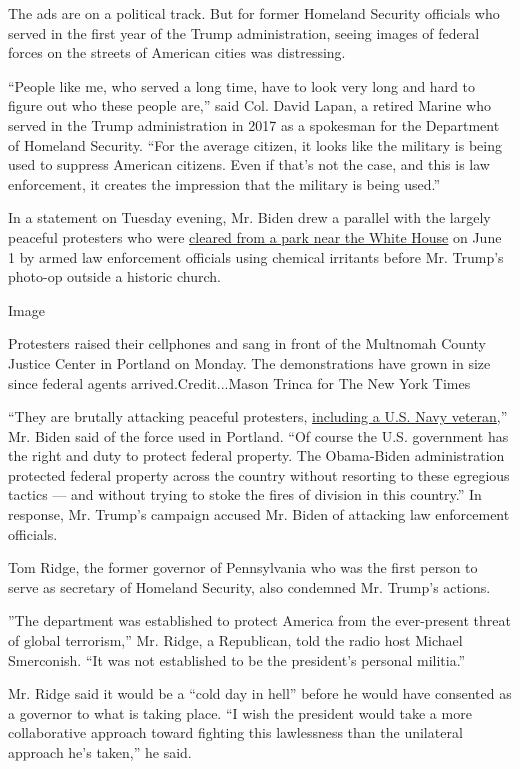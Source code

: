 The ads are on a political track. But for former Homeland Security
officials who served in the first year of the Trump administration,
seeing images of federal forces on the streets of American cities was
distressing.

``People like me, who served a long time, have to look very long and
hard to figure out who these people are,'' said Col. David Lapan, a
retired Marine who served in the Trump administration in 2017 as a
spokesman for the Department of Homeland Security. ``For the average
citizen, it looks like the military is being used to suppress American
citizens. Even if that's not the case, and this is law enforcement, it
creates the impression that the military is being used.''

In a statement on Tuesday evening, Mr. Biden drew a parallel with the
largely peaceful protesters who were
\href{https://www.nytimes.com/2020/06/02/us/politics/trump-walk-lafayette-square.html}{cleared
from a park near the White House} on June 1 by armed law enforcement
officials using chemical irritants before Mr. Trump's photo-op outside a
historic church.

Image

Protesters raised their cellphones and sang in front of the Multnomah
County Justice Center in Portland on Monday. The demonstrations have
grown in size since federal agents arrived.Credit...Mason Trinca for The
New York Times

``They are brutally attacking peaceful protesters,
\href{https://www.nytimes.com/2020/07/20/us/portland-protests-navy-christopher-david.html}{including
a U.S. Navy veteran},'' Mr. Biden said of the force used in Portland.
``Of course the U.S. government has the right and duty to protect
federal property. The Obama-Biden administration protected federal
property across the country without resorting to these egregious tactics
--- and without trying to stoke the fires of division in this country.''
In response, Mr. Trump's campaign accused Mr. Biden of attacking law
enforcement officials.

Tom Ridge, the former governor of Pennsylvania who was the first person
to serve as secretary of Homeland Security, also condemned Mr. Trump's
actions.

''The department was established to protect America from the
ever-present threat of global terrorism,'' Mr. Ridge, a Republican, told
the radio host Michael Smerconish. ``It was not established to be the
president's personal militia.''

Mr. Ridge said it would be a ``cold day in hell'' before he would have
consented as a governor to what is taking place. ``I wish the president
would take a more collaborative approach toward fighting this
lawlessness than the unilateral approach he's taken,'' he said.

